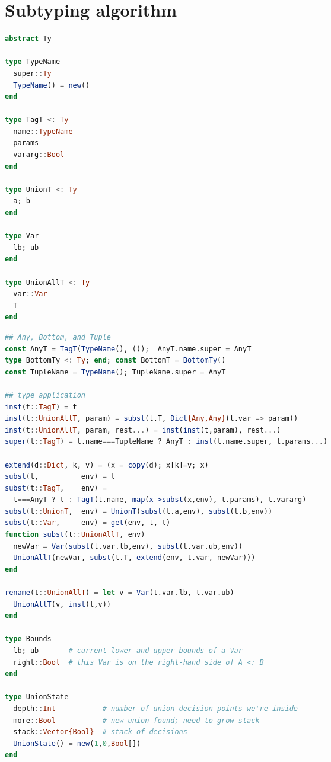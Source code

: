\chapter{Subtyping algorithm}
\label{appendix:subtyping}

\begin{singlespace}
\begin{multicols}{2}
\begin{lstlisting}[language=julia]
abstract Ty

type TypeName
  super::Ty
  TypeName() = new()
end

type TagT <: Ty
  name::TypeName
  params
  vararg::Bool
end

type UnionT <: Ty
  a; b
end

type Var
  lb; ub
end

type UnionAllT <: Ty
  var::Var
  T
end
\end{lstlisting}
\end{multicols}

\vspace{-3ex}
\begin{lstlisting}[language=julia]
## Any, Bottom, and Tuple
const AnyT = TagT(TypeName(), ());  AnyT.name.super = AnyT
type BottomTy <: Ty; end; const BottomT = BottomTy()
const TupleName = TypeName(); TupleName.super = AnyT

## type application
inst(t::TagT) = t
inst(t::UnionAllT, param) = subst(t.T, Dict{Any,Any}(t.var => param))
inst(t::UnionAllT, param, rest...) = inst(inst(t,param), rest...)
super(t::TagT) = t.name===TupleName ? AnyT : inst(t.name.super, t.params...)

extend(d::Dict, k, v) = (x = copy(d); x[k]=v; x)
subst(t,          env) = t
subst(t::TagT,    env) =
  t===AnyT ? t : TagT(t.name, map(x->subst(x,env), t.params), t.vararg)
subst(t::UnionT,  env) = UnionT(subst(t.a,env), subst(t.b,env))
subst(t::Var,     env) = get(env, t, t)
function subst(t::UnionAllT, env)
  newVar = Var(subst(t.var.lb,env), subst(t.var.ub,env))
  UnionAllT(newVar, subst(t.T, extend(env, t.var, newVar)))
end

rename(t::UnionAllT) = let v = Var(t.var.lb, t.var.ub)
  UnionAllT(v, inst(t,v))
end

type Bounds
  lb; ub       # current lower and upper bounds of a Var
  right::Bool  # this Var is on the right-hand side of A <: B
end

type UnionState
  depth::Int           # number of union decision points we're inside
  more::Bool           # new union found; need to grow stack
  stack::Vector{Bool}  # stack of decisions
  UnionState() = new(1,0,Bool[])
end


\end{lstlisting}
\end{singlespace}
